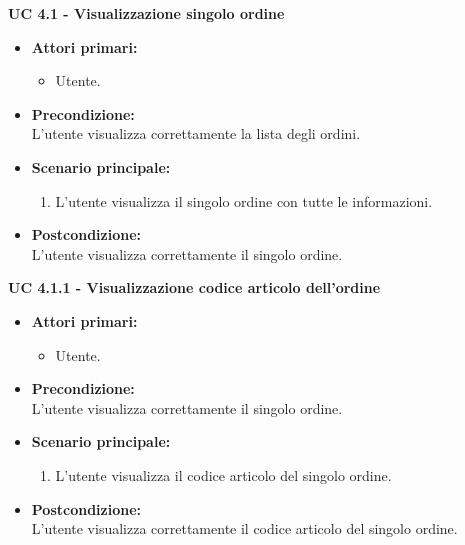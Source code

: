 \vspace{0.5cm}

\noindent \textbf{\large UC 4.1 - Visualizzazione singolo ordine}
\label{uc:visualizzazione-singolo-ordine}
\begin{itemize}

	\item \textbf{Attori primari: }
		\begin{itemize}
			\item Utente.
		\end{itemize}

	\item \textbf{Precondizione: }\\[0.3cm]
		L'utente visualizza correttamente la lista degli ordini.

	\item \textbf{Scenario principale: }
		\begin{enumerate}
			\item L'utente visualizza il singolo ordine con tutte le informazioni.
		\end{enumerate}
		

	\item \textbf{Postcondizione: }\\[0.3cm]
		L'utente visualizza correttamente il singolo ordine.

\end{itemize}

\vspace{0.5cm}

\noindent \textbf{\large UC 4.1.1 - Visualizzazione codice articolo dell'ordine}
\label{uc:visualizzazione-codice-articolo}
\begin{itemize}

	\item \textbf{Attori primari: }
		\begin{itemize}
			\item Utente.
		\end{itemize}

	\item \textbf{Precondizione: }\\[0.3cm]
		L'utente visualizza correttamente il singolo ordine.

	\item \textbf{Scenario principale: }
		\begin{enumerate}
			\item L'utente visualizza il codice articolo del singolo ordine.
		\end{enumerate}
		

	\item \textbf{Postcondizione: }\\[0.3cm]
		L'utente visualizza correttamente il codice articolo del singolo ordine.

\end{itemize}

